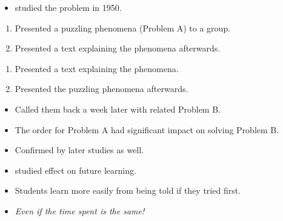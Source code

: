 \begin{frame}
  \begin{example}
    \begin{itemize}
      \item \Textcite{Szekely1950} studied the problem in 1950.
    \end{itemize}
    \begin{enumerate}
      \item<1,3> Presented a puzzling phenomena (Problem A) to a group.
      \item<1,3> Presented a text explaining the phenomena afterwards.
    \end{enumerate}
    \begin{enumerate}
      \item<2,3> Presented a text explaining the phenomena.
      \item<2,3> Presented the puzzling phenomena afterwards.
    \end{enumerate}
    \begin{itemize}
      \item<4> Called them back a week later with related Problem B.
      \item<4> The order for Problem A had significant impact on solving 
        Problem B.
    \end{itemize}
  \end{example}
\end{frame}

\begin{frame}
  \begin{remark}[Reproduced]
    \begin{itemize}
      \item Confirmed by later studies as well.
      \item \Textcite{BransfordSchwartz1999} studied effect on future learning.
      \item Students learn more easily from being told if they tried first.
    \end{itemize}
  \end{remark}

  \pause

  \begin{remark}
    \begin{itemize}
      \item \emph{Even if the time spent is the same!}
    \end{itemize}
  \end{remark}
\end{frame}

